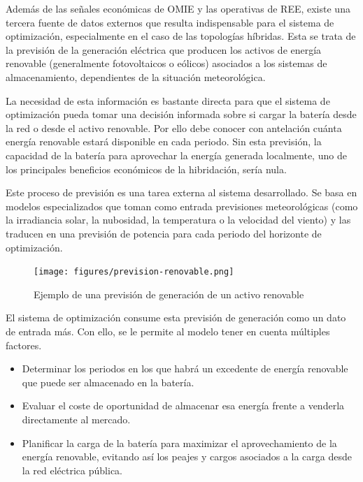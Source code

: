 Además de las señales económicas de OMIE y las operativas de REE, existe una tercera fuente de datos externos que resulta indispensable para el sistema de optimización, especialmente en el caso de las topologías híbridas. Esta se trata de la previsión de la generación eléctrica que producen los activos de energía renovable (generalmente fotovoltaicos o eólicos) asociados a los sistemas de almacenamiento, dependientes de la situación meteorológica.

La necesidad de esta información es bastante directa para que el sistema de optimización pueda tomar una decisión informada sobre si cargar la batería desde la red o desde el activo renovable. Por ello debe conocer con antelación cuánta energía renovable estará disponible en cada periodo. Sin esta previsión, la capacidad de la batería para aprovechar la energía generada localmente, uno de los principales beneficios económicos de la hibridación, sería nula.

Este proceso de previsión es una tarea externa al sistema desarrollado. Se basa en modelos especializados que toman como entrada previsiones meteorológicas (como la irradiancia solar, la nubosidad, la temperatura o la velocidad del viento) y las traducen en una previsión de potencia para cada periodo del horizonte de optimización.

\begin{figure}
\centering
\texttt{[image: figures/prevision-renovable.png]}
\caption{Ejemplo de una previsión de generación de un activo renovable}
\label{fig:prevision-renovable}
\end{figure}

El sistema de optimización consume esta previsión de generación como un dato de entrada más. Con ello, se le permite al modelo tener en cuenta múltiples factores.

\begin{itemize}

\item Determinar los periodos en los que habrá un excedente de energía renovable que puede ser almacenado en la batería.

\item Evaluar el coste de oportunidad de almacenar esa energía frente a venderla directamente al mercado.

\item Planificar la carga de la batería para maximizar el aprovechamiento de la energía renovable, evitando así los peajes y cargos asociados a la carga desde la red eléctrica pública.

\end{itemize}

